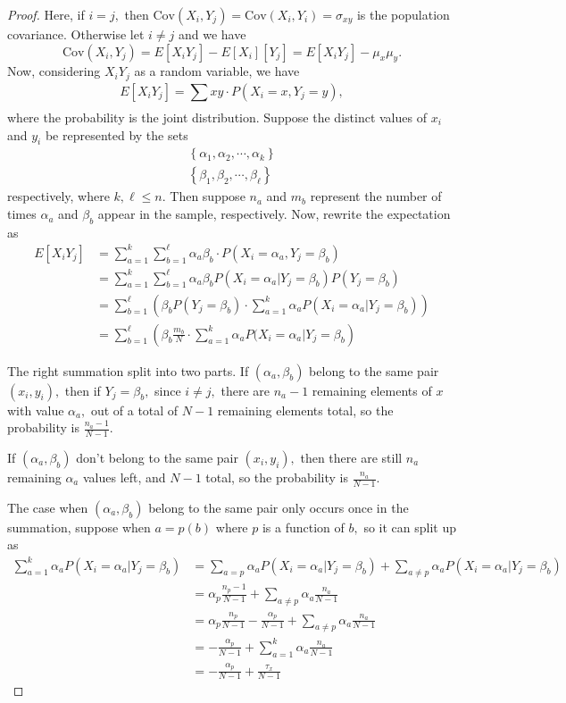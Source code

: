 \documentclass{article}
\newcommand{\cov}{\mathrm{Cov}}
\begin{document}
\begin{enumerate}
\begin{proof}
			Here, if $i=j,$ then $\cov(X_i, Y_j)=\cov(X_i, Y_i)=\sigma_{xy}$ is the population covariance. Otherwise let $i\neq j$ and we have \[\cov(X_i, Y_j) = E[X_iY_j] - E[X_i][Y_j] = E[X_iY_j]-\mu_x\mu_y.\] Now, considering $X_iY_j$ as a random variable, we have \[E[X_iY_j] = \sum_{}^{}xy \cdot P(X_i=x, Y_j=y), \] where the probability is the joint distribution. Suppose the distinct values of $x_i$ and $y_i$ be represented by the sets 
			\begin{align*}
				\left\{ \alpha_1, \alpha_2, \cdots, \alpha_k \right\} \\
				\left\{ \beta_1, \beta_2, \cdots, \beta_\ell \right\}
			\end{align*} respectively, where $k, \ell \le n.$ Then suppose $n_a$ and $m_b$ represent the number of times $\alpha_a$ and $\beta_b$ appear in the sample, respectively. Now, rewrite the expectation as 
			\begin{align*}
				E[X_iY_j] &= \sum_{a=1}^{k} \sum_{b=1}^{\ell} \alpha_a \beta_b \cdot P(X_i=\alpha_a, Y_j = \beta_b) \\
				&= \sum_{a=1}^{k}\sum_{b=1}^{\ell} \alpha_a\beta_b P(X_i=\alpha_a|Y_j=\beta_b)P(Y_j=\beta_b) \\
				&= \sum_{b=1}^{\ell} \left( \beta_b P(Y_j=\beta_b)\cdot \sum_{a=1}^{k} \alpha_a P(X_i=\alpha_a | Y_j = \beta_b) \right) \\
				&= \sum_{b=1}^{\ell} \left( \beta_b \frac{m_b}{N}\cdot \sum_{a=1}^{k} \alpha_a P(X_i=\alpha_a | Y_j=\beta_b \right)
			\end{align*}

			The right summation split into two parts. If $(\alpha_a, \beta_b)$ belong to the same pair $(x_i, y_i),$ then if $Y_j=\beta_b,$ since $i\neq j,$ there are $n_a-1$ remaining elements of $x$ with value $\alpha_a,$ out of a total of $N-1$ remaining elements total, so the probability is $\frac{n_a-1}{N-1}.$ 

			If $(\alpha_a, \beta_b)$ don't belong to the same pair $(x_i, y_i),$ then there are still $n_a$ remaining $\alpha_a$ values left, and $N-1$ total, so the probability is $\frac{n_a}{N-1}.$

			The case when $(\alpha_a, \beta_b)$ belong to the same pair only occurs once in the summation, suppose when $a=p(b)$ where $p$ is a function of $b,$ so it can split up as 
			\begin{align*}
				\sum_{a=1}^{k}\alpha_a P(X_i=\alpha_a|Y_j=\beta_b) &= \sum_{a=p}^{} \alpha_a P(X_i=\alpha_a|Y_j=\beta_b) + \sum_{a\neq p}^{} \alpha_a P(X_i=\alpha_a|Y_j=\beta_b) \\
				&= \alpha_p \frac{n_p-1}{N-1} + \sum_{a\neq p}^{}\alpha_a \frac{n_a}{N-1} \\
				&= \alpha_p \frac{n_p}{N-1} - \frac{\alpha_p}{N-1}+ \sum_{a\neq p}^{}\alpha_a \frac{n_a}{N-1} \\
				&= -\frac{\alpha_p}{N-1} + \sum_{a=1}^{k} \alpha_a \frac{n_a}{N-1} \\
				&= -\frac{\alpha_p}{N-1} + \frac{\tau_x}{N-1}
			\end{align*}


\end{proof}
\end{enumerate}
\end{document}
